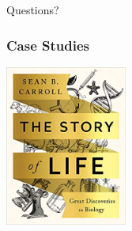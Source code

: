 \documentclass[10pt]{beamer}
\begin{document}
	
\begin{frame}
	\begin{center}
		\Huge{\textcolor{myblue}{Questions?}}
	\end{center}	
\end{frame}


\begin{frame}[t]
\frametitle{Case Studies}
\vspace{0.25cm}

	\begin{center}
		\includegraphics[width=0.3\textwidth]{../Topic1-Introduction/figures/carroll.jpg}
	\end{center}
\end{frame}
\end{document}
